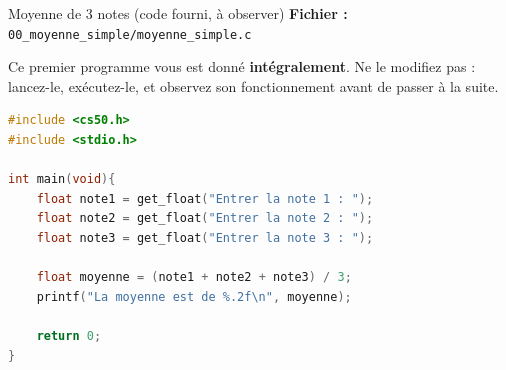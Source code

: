 \begin{UPSTIexercice}{Moyenne de 3 notes (code fourni, à observer)}
  \textbf{Fichier :} \texttt{00\_moyenne\_simple/moyenne\_simple.c}

  Ce premier programme vous est donné \textbf{intégralement}. Ne le modifiez pas : lancez-le, exécutez-le, et observez son fonctionnement avant de passer à la suite.

  \begin{lstlisting}[language=C]
#include <cs50.h>
#include <stdio.h>

int main(void){
    float note1 = get_float("Entrer la note 1 : ");
    float note2 = get_float("Entrer la note 2 : ");
    float note3 = get_float("Entrer la note 3 : ");

    float moyenne = (note1 + note2 + note3) / 3;
    printf("La moyenne est de %.2f\n", moyenne);

    return 0;
}
  \end{lstlisting}

\end{UPSTIexercice}


